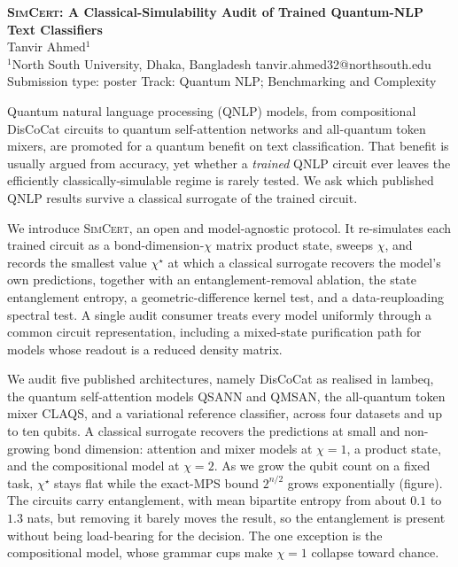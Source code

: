 \documentclass[11pt]{article}
\begin{document}
\begin{center}
{\large\bfseries \textsc{SimCert}: A Classical-Simulability Audit of Trained Quantum-NLP Text Classifiers}\\[5pt]
{\normalsize Tanvir Ahmed$^{1}$}\\[2pt]
{\small $^{1}$North South University, Dhaka, Bangladesh \quad\textbullet\quad tanvir.ahmed32@northsouth.edu}\\[2pt]
{\small Submission type: poster \quad\textbullet\quad Track: Quantum NLP; Benchmarking and Complexity}
\end{center}
\vspace{1pt}

Quantum natural language processing (QNLP) models, from compositional DisCoCat circuits to quantum
self-attention networks and all-quantum token mixers, are promoted for a quantum benefit on text
classification. That benefit is usually argued from accuracy, yet whether a \emph{trained} QNLP
circuit ever leaves the efficiently classically-simulable regime is rarely tested. We ask which
published QNLP results survive a classical surrogate of the trained circuit.

We introduce \textsc{SimCert}, an open and model-agnostic protocol. It re-simulates each trained
circuit as a bond-dimension-$\chi$ matrix product state, sweeps $\chi$, and records the smallest
value $\chi^\star$ at which a classical surrogate recovers the model's own predictions, together with
an entanglement-removal ablation, the state entanglement entropy, a geometric-difference kernel test,
and a data-reuploading spectral test. A single audit consumer treats every model uniformly through a
common circuit representation, including a mixed-state purification path for models whose readout is a
reduced density matrix.

We audit five published architectures, namely DisCoCat as realised in lambeq, the quantum
self-attention models QSANN and QMSAN, the all-quantum token mixer CLAQS, and a variational reference
classifier, across four datasets and up to ten qubits. A classical surrogate recovers the predictions
at small and non-growing bond dimension: attention and mixer models at $\chi{=}1$, a product state,
and the compositional model at $\chi{=}2$. As we grow the qubit count on a fixed task, $\chi^\star$
stays flat while the exact-MPS bound $2^{n/2}$ grows exponentially (figure). The circuits carry
entanglement, with mean bipartite entropy from about $0.1$ to $1.3$ nats, but removing it barely moves
the result, so the entanglement is present without being load-bearing for the decision. The one
exception is the compositional model, whose grammar cups make $\chi{=}1$ collapse toward chance.
\end{document}
